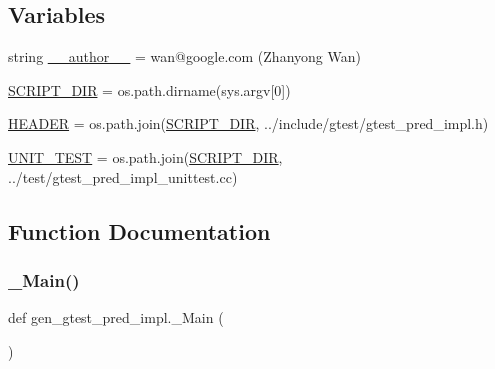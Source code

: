 \subsection*{Variables}
\begin{DoxyCompactItemize}
\item 
string \hyperlink{namespacegen__gtest__pred__impl_af32e92d473ee6c427929cb7ddb4db7e6}{\+\_\+\+\_\+author\+\_\+\+\_\+} = \textquotesingle{}wan@google.\+com (Zhanyong Wan)\textquotesingle{}
\item 
\hyperlink{namespacegen__gtest__pred__impl_aed087c7fc787a064f0a9fd5f5f9f6487}{S\+C\+R\+I\+P\+T\+\_\+\+D\+IR} = os.\+path.\+dirname(sys.\+argv\mbox{[}0\mbox{]})
\item 
\hyperlink{namespacegen__gtest__pred__impl_ab96c63705e2cb7619876ba592dab4c8e}{H\+E\+A\+D\+ER} = os.\+path.\+join(\hyperlink{namespacegen__gtest__pred__impl_aed087c7fc787a064f0a9fd5f5f9f6487}{S\+C\+R\+I\+P\+T\+\_\+\+D\+IR}, \textquotesingle{}../include/gtest/gtest\+\_\+pred\+\_\+impl.\+h\textquotesingle{})
\item 
\hyperlink{namespacegen__gtest__pred__impl_a8c1cb8e87c4bd84edbb958f73b7df200}{U\+N\+I\+T\+\_\+\+T\+E\+ST} = os.\+path.\+join(\hyperlink{namespacegen__gtest__pred__impl_aed087c7fc787a064f0a9fd5f5f9f6487}{S\+C\+R\+I\+P\+T\+\_\+\+D\+IR}, \textquotesingle{}../test/gtest\+\_\+pred\+\_\+impl\+\_\+unittest.\+cc\textquotesingle{})
\end{DoxyCompactItemize}


\subsection{Function Documentation}
\mbox{\label{namespacegen__gtest__pred__impl_a50dd74615a1507ce657c8fa24d7c161e}} 
\subsubsection{\texorpdfstring{\+\_\+\+Main()}{\_Main()}}
{\footnotesize\ttfamily def gen\+\_\+gtest\+\_\+pred\+\_\+impl.\+\_\+\+Main (\begin{DoxyParamCaption}{ }\end{DoxyParamCaption})\hspace{0.3cm}{\ttfamily [private]}}

